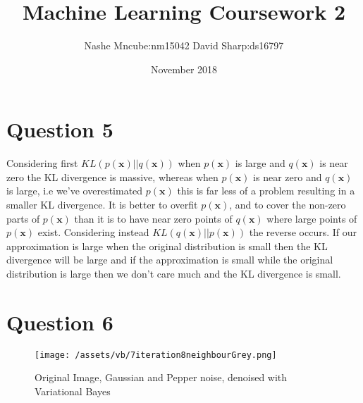 \documentclass[10pt]{article}
\title{Machine Learning Coursework 2}
\author{Nashe Mncube:nm15042 David Sharp:ds16797}
\date{November 2018}
\begin{document}
    \maketitle

    \section{Question 5}
    Considering first $KL(p(\mathbf{x})||q(\mathbf{x}))$ when $p(\mathbf{x})$ is large and $q(\mathbf{x})$ is near zero
    the KL divergence is massive, whereas when $p(\mathbf{x})$ is near zero and $q(\mathbf{x})$ is large, i.e we've
    overestimated $p(\mathbf{x})$ this is far less of a problem resulting in a smaller KL divergence.
    It is better to overfit $p(\mathbf{x})$, and to cover the non-zero parts of $p(\mathbf{x})$ than it is
    to have near zero points of $q(\mathbf{x})$ where large points of $p(\mathbf{x})$ exist.
    Considering instead $KL(q(\mathbf{x})||p(\mathbf{x}))$ the reverse occurs. If our approximation is large when the
    original distribution is small then the KL divergence will be large and if the approximation is small while the
    original distribution is large then we don't care much and the KL divergence is small.

    \section{Question 6}

    \begin{figure}[h]
        \caption{Original Image, Gaussian and Pepper noise, denoised with Variational Bayes}
        \centering
        \texttt{[image: /assets/vb/7iteration8neighbourGrey.png]}
        \label{fig:variationalBayes}
    \end{figure}






  
\end{document}
